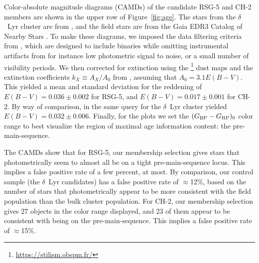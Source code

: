 \documentclass[12pt,twocolumn,linenumbers]{aastex63}
\newcommand{\bpmrpo}{(G_{\rm BP}-G_{\rm RP})_0}
\begin{document}
Color-absolute magnitude diagrams (CAMDs) of the candidate RSG-5 and
CH-2 members are shown in the upper row of Figure~\ref{fig:age}.  The
stars from the $\delta$~Lyr cluster are from
\citet{bouma_kep1627_2022}, and the field stars are from the Gaia EDR3
Catalog of Nearby Stars \citep{gaia_gcns_2021}.  To make these
diagrams, we imposed the data filtering criteria from
\citet[][Appendix B]{GaiaCollaboration2018}, which are designed to
include binaries while omitting instrumental artifacts from for
instance low photometric signal to noise, or a small number of
visibility periods.  We then corrected for extinction using the
\citet{lallement_threedimensional_2018}\footnote{\url{https://stilism.obspm.fr/}}
dust maps and the extinction coefficients $k_X\equiv A_X/A_0$ from
\citet{GaiaCollaboration2018}, assuming that $A_0 = 3.1 E(B-V)$.  This
yielded a mean and standard deviation for the reddening of
$E(B-V)=0.036\pm0.002$ for RSG-5, and $E(B-V)=0.017\pm0.001$
for CH-2.  By way of comparison, in \citet{bouma_kep1627_2022} the
same query for the $\delta$~Lyr cluster yielded
$E(B-V)=0.032\pm0.006$.  Finally, for the plots we set the $\bpmrpo$
color range to best visualize the region of maximal age information
content: the pre-main-sequence.

The CAMDs show that for RSG-5, our membership selection gives stars
that photometrically seem to almost all be on a tight
pre-main-sequence locus.  This implies a false positive rate of 
a few percent, at most.  By comparison, our control sample (the $\delta$~Lyr
candidates) has a false positive rate of $\approx$12\%, based on the
number of stars that photometrically appear to be more consistent with
the field population than the bulk cluster population.  For CH-2, our
membership selection gives 27 objects in the color range displayed,
and 23 of them appear to be consistent with being on the
pre-main-sequence.  This implies a false positive rate of
$\approx$15\%.
\end{document}
